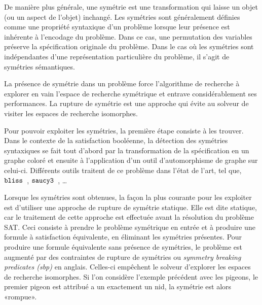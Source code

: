 De manière plus  générale, une symétrie est une transformation qui laisse un objet (ou un aspect de l'objet) inchangé. Les symétries sont généralement définies comme une propriété syntaxique d'un problème lorsque leur présence est inhérente à l'encodage du problème.
Dans ce cas, une permutation des variables préserve la spécification originale du problème.
Dans le cas où les symétries sont indépendantes d'une représentation particulière du problème, il s'agit de symétries sémantiques.

La présence de symétrie dans un problème force l'algorithme de recherche à explorer en vain l'espace de recherche symétrique et entrave considérablement ses performances.  La rupture de symétrie est une approche qui évite au solveur de visiter les espaces de recherche isomorphes.

Pour pouvoir exploiter les symétries, la première étape consiste à les trouver. Dans le contexte de la satisfaction booléenne, la détection des symétries syntaxiques se fait tout d'abord par la transformation de la spécification en un graphe coloré et ensuite à l'application d'un outil d'automorphisme de graphe sur celui-ci.
Différents outils traitent de ce problème dans l'état de l'art, tel que, $\texttt{bliss}$~\cite{JunttilaKaski:ALENEX2007}, $\texttt{saucy3}$~\cite{katebi2010symmetry}, …


Lorsque les symétries sont obtenues, la façon la plus courante pour les exploiter est d'utiliser une approche de rupture de symétrie statique. Elle est dite statique, car le traitement de cette approche  est effectuée avant la résolution du problème SAT.
Ceci consiste à prendre le problème symétrique en entrée et à produire une formule à satisfaction équivalente, en éliminant les symétries présentes. %
Pour produire une formule équivalente sans présence de symétries, le problème est augmenté par des 
contraintes de rupture de  symétries ou \textit{symmetry breaking predicates (sbp)} en anglais.
 Celles-ci empêchent le solveur d'explorer les espaces de recherche isomorphes. 
Si l'on considère l'exemple précédent avec les pigeons, le premier pigeon est attribué a un
exactement un nid, la symétrie est alors «rompue».

